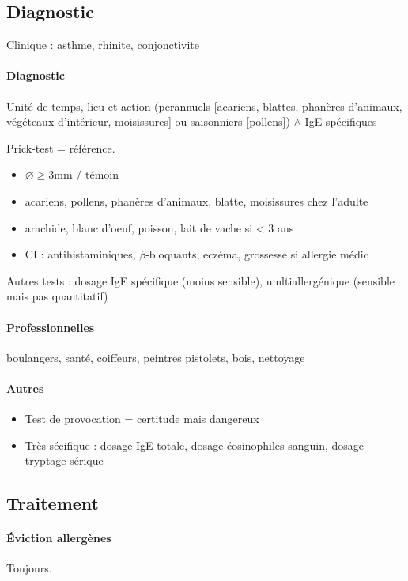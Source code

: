 \subsection{Diagnostic}
Clinique : asthme, rhinite, conjonctivite

\paragraph{Diagnostic}
Unité de temps, lieu et action (perannuels [acariens,
blattes, phanères d'animaux, végéteaux d'intérieur, moisissures] ou saisonniers
[pollens]) $\wedge$ IgE spécifiques

Prick-test = référence.
\begin{itemize}
  \item $\diameter \ge 3$mm / témoin
  \item acariens, pollens, phanères d'animaux, blatte, moisissures chez l'adulte
  \item arachide, blanc d'oeuf, poisson, lait de vache si < 3 ans
  \item CI : antihistaminiques, $\beta$-bloquants, eczéma, grossesse si
      allergie médic
\end{itemize}

Autres tests : dosage IgE spécifique (moins sensible), umltiallergénique (sensible mais
    pas quantitatif)

\paragraph{Professionnelles} boulangers, santé, coiffeurs, peintres pistolets, bois, nettoyage\\

\paragraph{Autres}
\begin{itemize}
  \item Test de provocation = certitude mais dangereux
  \item Très sécifique : dosage IgE totale, dosage éosinophiles sanguin, dosage tryptage sérique
\end{itemize}

\subsection{Traitement}
\paragraph{Éviction allergènes} Toujours.

